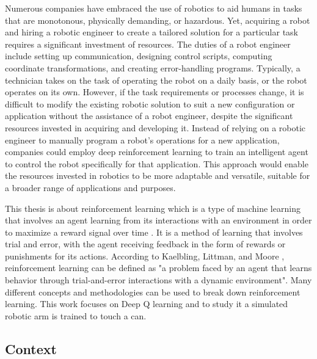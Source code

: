 \documentclass[12pt,oneside]{article}
\begin{document}
Numerous companies have embraced the use of robotics to aid humans in tasks that are monotonous, physically demanding, or hazardous. Yet, acquiring a robot and hiring a robotic engineer to create a tailored solution for a particular task requires a significant investment of resources.
The duties of a robot engineer include setting up communication, designing control scripts, computing coordinate transformations, and creating error-handling programs. Typically, a technician takes on the task of operating the robot on a daily basis, or the robot operates on its own. However, if the task requirements or processes change, it is difficult to modify the existing robotic solution to suit a new configuration or application without the assistance of a robot engineer, despite the significant resources invested in acquiring and developing it.
Instead of relying on a robotic engineer to manually program a robot's operations for a new application, companies could employ deep reinforcement learning to train an intelligent agent to control the robot specifically for that application. This approach would enable the resources invested in robotics to be more adaptable and versatile, suitable for a broader range of applications and purposes.

This thesis is about reinforcement learning which is a type of machine learning that involves an agent learning from its interactions with an environment in order to maximize a reward signal over time \cite{suttonAndBarto}. It is a method of learning that involves trial and error, with the agent receiving feedback in the form of rewards or punishments for its actions. According to Kaelbling, Littman, and Moore \cite{kaelblingLittmanAndMoore}, reinforcement learning can be defined as "a problem faced by an agent that learns behavior through trial-and-error interactions with a dynamic environment".
Many different concepts and methodologies can be used to break down reinforcement learning. This work focuses on Deep Q learning and to study it a simulated robotic arm is trained to touch a can.

%
\subsection{Context}
\end{document}
